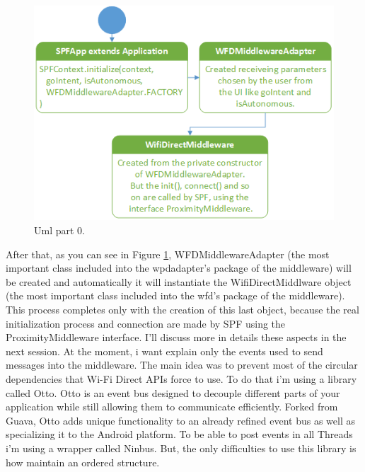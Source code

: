 \begin{figure}[thpb]
	\centering
	\includegraphics[scale=0.5]{./images/chap2/uml-parte0-1.png}
	\caption{Uml part 0.}
	\label{uml-part0-1}
\end{figure}	

After that, as you can see in Figure \ref{uml-part0-1}, WFDMiddlewareAdapter (the most important class included into the wpdadapter's package of the middleware) will be created and automatically it will instantiate the WifiDirectMiddlware object (the most important class included into the wfd's package of the middleware). This process completes only with the creation of this last object, because the real initialization process and  connection are made by SPF using the ProximityMiddleware interface. 
I'll discuss more in details these aspects in the next session.
At the moment, i want explain only the events used to send messages into the middleware. The main idea was to prevent most of the circular dependencies that Wi-Fi Direct APIs force to use.
To do that i'm using a library called Otto. 
Otto is an event bus designed to decouple different parts of your application while still allowing them to communicate efficiently. Forked from Guava, Otto adds unique functionality to an already refined event bus as well as specializing it to the Android platform.
To be able to post events in all Threads i'm using a wrapper called Ninbus.
But, the only difficulties to use this library is how maintain an ordered structure. 

